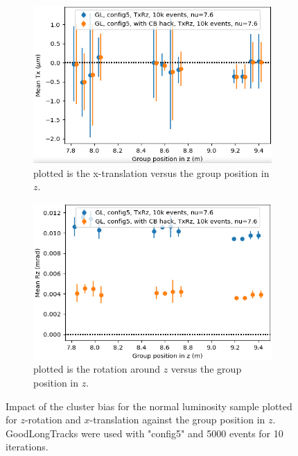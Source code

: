 \begin{figure}[htbp]
  \centering
  \begin{subfigure}[b]{0.48\textwidth}
    \centering
    \includegraphics[width=\textwidth]{plots/renewed_plots/e5/4_19_1.png}
    \caption{plotted is the x-translation versus the group position in $z$.}
    \label{fig:cbTxlow}
  \end{subfigure}
  \hfill
  \begin{subfigure}[b]{0.48\textwidth}
    \centering
    \includegraphics[width=\textwidth]{plots/renewed_plots/e5/4_19_2.png}
    \caption{plotted is the rotation around $z$ versus the group position in $z$.}
    \label{fig:cbRzlow}
  \end{subfigure}
  \caption{Impact of the cluster bias for the normal luminosity sample plotted for $z$-rotation and $x$-translation against the group position in $z$. GoodLongTracks were used with "config5" and 5000 events for 10 iterations.}
  \label{fig:cbnormal}
\end{figure}

